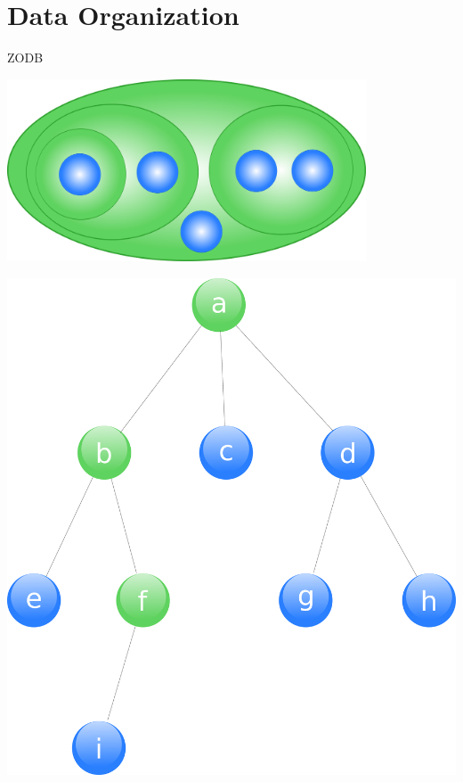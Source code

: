 \documentclass[arial,pdftex]{beamer}
\begin{document}
\section{Data Organization}

\begin{frame}{ZODB}
  \begin{center}
    \includegraphics[width=0.8\textwidth]{contain.pdf}
  \end{center}
\end{frame}

\begin{frame}
  \vspace{5.5mm}
  \begin{center}\includegraphics[height=0.8\textheight]{tree.pdf}\end{center}
\end{frame}
\end{document}
